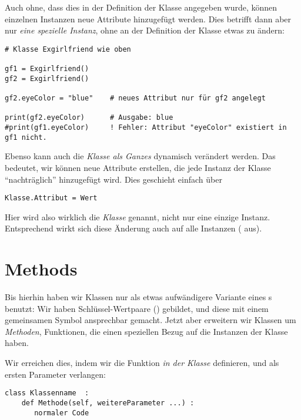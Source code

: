Auch ohne, dass dies in der Definition der Klasse angegeben wurde, können einzelnen Instanzen neue Attribute hinzugefügt werden. Dies betrifft dann aber nur \emph{eine spezielle Instanz}, ohne an der Definition der Klasse etwas zu ändern:
\begin{codebox}
\begin{verbatim}
# Klasse Exgirlfriend wie oben

gf1 = Exgirlfriend()
gf2 = Exgirlfriend()

gf2.eyeColor = "blue"    # neues Attribut nur für gf2 angelegt

print(gf2.eyeColor)      # Ausgabe: blue
#print(gf1.eyeColor)     ! Fehler: Attribut "eyeColor" existiert in gf1 nicht.
\end{verbatim}
\end{codebox}

Ebenso kann auch die \emph{Klasse als Ganzes} dynamisch verändert werden. Das bedeutet, wir können neue Attribute erstellen, die jede Instanz der Klasse \enquote{nachträglich} hinzugefügt wird. Dies geschieht einfach über
\begin{codebox}
\begin{verbatim}
Klasse.Attribut = Wert
\end{verbatim}
\end{codebox}

Hier wird also wirklich die \emph{Klasse} genannt, nicht nur eine einzige Instanz. Entsprechend wirkt sich diese Änderung auch auf alle Instanzen (\eg {} aus).

\section{Methods}
Bis hierhin haben wir Klassen nur als etwas aufwändigere Variante eines s benutzt: Wir haben Schlüssel-Wertpaare (\eg {}) gebildet, und diese mit einem gemeinsamen Symbol ansprechbar gemacht. Jetzt aber erweitern wir Klassen um \emph{Methoden}, \ie Funktionen, die einen speziellen Bezug auf die Instanzen der Klasse haben.

Wir erreichen dies, indem wir die Funktion \emph{in der Klasse} definieren, und als ersten Parameter  verlangen:
\begin{codebox}
\begin{verbatim}
class Klassenname  :
    def Methode(self, weitereParameter ...) :
       normaler Code
\end{verbatim}
\end{codebox}

